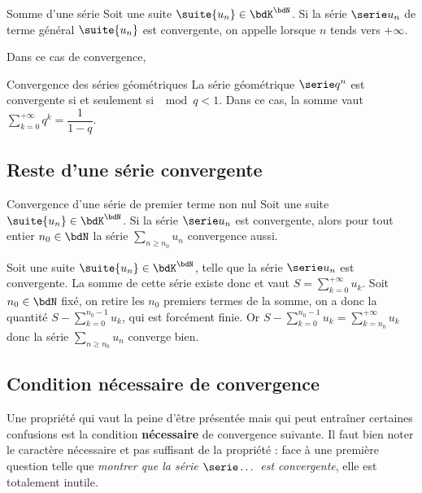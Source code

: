 \documentclass[a4paper,french,bookmarks]{article}
\begin{document}
\begin{definition}{Somme d'une série}{}
    Soit une suite $\suite{u_n} \in \bdK^\bdN$. Si la série $\serie u_n$ de terme général $\suite{u_n}$ est convergente, on appelle  lorsque $n$ tends vers $+\infty$.
\end{definition}

Dans ce cas de convergence, 

\begin{theorem}{Convergence des séries géométriques}{}
    La série géométrique $\serie q^n$ est convergente si et seulement si $\mod{q} < 1$. Dans ce cas, la somme vaut $\displaystyle\sum_{k=0}^{+\infty} q^k = \dfrac{1}{1-q}$.
\end{theorem}

\subsection{Reste d'une série convergente}

\begin{property}{Convergence d'une série de premier terme non nul}{}
    Soit une suite $\suite{u_n} \in \bdK^\bdN$. Si la série $\serie u_n$ est convergente, alors pour tout entier $n_0 \in \bdN$ la série $\textstyle{\sum\limits_{n \geq n_0}} u_n$ convergence aussi.
\end{property}

\begin{nproof}
    Soit une suite $\suite{u_n} \in \bdK^\bdN$, telle que la série $\serie u_n$ est convergente. La somme de cette série existe donc et vaut $S = \displaystyle\sum_{k=0}^{+\infty} u_k$. Soit $n_0 \in \bdN$ fixé, on retire les $n_0$ premiers termes de la somme, on a donc la quantité $S - \displaystyle\sum_{k=0}^{n_0 - 1} u_k$, qui est forcément finie. Or $S - \displaystyle\sum_{k=0}^{n_0 - 1} u_k = \displaystyle\sum_{k=n_0}^{+\infty} u_k$ donc la série $\textstyle{\sum\limits_{n \geq n_0}} u_n$ converge bien.
\end{nproof}

\subsection{Condition nécessaire de convergence}

Une propriété qui vaut la peine d'être présentée mais qui peut entraîner certaines confusions est la condition \textbf{\color{main21} nécessaire} de convergence suivante. Il faut bien noter le caractère nécessaire et pas suffisant de la propriété : face à une première question telle que \textit{montrer que la série $\serie \dots$ est convergente}, elle est totalement inutile.
\end{document}
